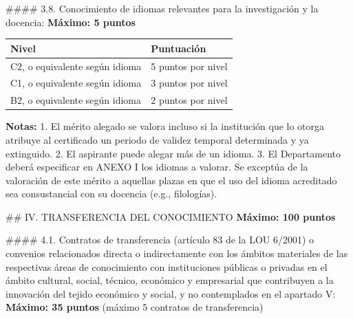 \documentclass{article}
\begin{document}
\begin{itemize}
\begin{itemize}
\begin{scriptsize}
                  \#\#\#\# 3.8. Conocimiento de idiomas relevantes para la investigación y la docencia:
                  \textbf{Máximo: 5 puntos}

                  \vspace{0.4cm}
                  \begin{table}[h!]\centering\renewcommand{\arraystretch}{1.3}
                    \begin{tabular}{|p{}|p{}|}\hline
                      Nivel                          & Puntuación         \\\hline
                      C2, o equivalente según idioma & 5 puntos por nivel \\\hline
                      C1, o equivalente según idioma & 3 puntos por nivel \\\hline
                      B2, o equivalente según idioma & 2 puntos por nivel \\\hline
                    \end{tabular}\end{table}
                  \vspace{0.4cm}

                  \textbf{Notas:}
                  1. El mérito alegado se valora incluso si la institución que lo otorga atribuye al certificado un periodo de validez temporal determinada y ya extinguido.
                  2. El aspirante puede alegar más de un idioma.
                  3. El Departamento deberá especificar en ANEXO I los idiomas a valorar. Se exceptúa de la valoración de este mérito a aquellas plazas en que el uso del idioma acreditado sea consustancial con su docencia (e.g., filologías).

                  \#\# IV. TRANSFERENCIA DEL CONOCIMIENTO
                  \textbf{Máximo: 100 puntos}

                  \#\#\#\# 4.1. Contratos de transferencia (artículo 83 de la LOU 6/2001) o convenios relacionados directa o indirectamente con los ámbitos materiales de las respectivas áreas de conocimiento con instituciones públicas o privadas en el ámbito cultural, social, técnico, económico y empresarial que contribuyen a la innovación del tejido económico y social, y no contemplados en el apartado V:\textit{}
                  \textbf{Máximo: 35 puntos}
                  (máximo 5 contratos de transferencia)


\end{scriptsize}
\end{itemize}
\end{itemize}
\end{document}
